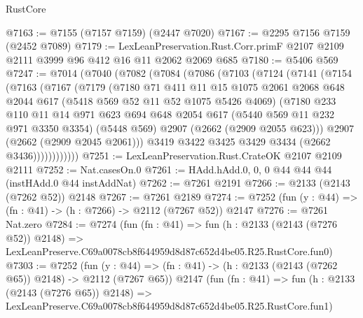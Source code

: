 \begin{lexlean}{RustCore}
\begin{coremodule}
@7163 := @7155 (@7157 @7159) (@2447 @7020)
@7167 := @2295 @7156 @7159 (@2452 @7089)
@7179 := LexLeanPreservation.Rust.Corr.primF
    @2107
    @2109
    @2111
    @3999
    @96
    @412
    @16
    @11
    @2062
    @2069
    @685
@7180 := @5406 @569
@7247 := @7014
    (@7040
      (@7082
        (@7084
          (@7086
            (@7103
              (@7124
                (@7141
                  (@7154
                    (@7163
                      (@7167
                        (@7179
                          (@7180
                            @71
                            @411
                            @11
                            @15
                            @1075
                            @2061
                            @2068
                            @648
                            @2044
                            @617
                            (@5418 @569 @52 @11 @52 @1075 @5426 @4069)
                            (@7180
                              @233
                              @110
                              @11
                              @14
                              @971
                              @623
                              @694
                              @648
                              @2054
                              @617
                              (@5440 @569 @11 @232 @971 @3350 @3354)
                              (@5448 @569)
                              @2907
                              (@2662 (@2909 @2055 @623)))
                            @2907
                            (@2662 (@2909 @2045 @2061)))
                          @3419
                          @3422
                          @3425
                          @3429
                          @3434
                          (@2662 @3436))))))))))))
@7251 := LexLeanPreservation.Rust.CrateOK @2107 @2109 @2111
@7252 := Nat.casesOn.{0}
@7261 := HAdd.hAdd.{0, 0, 0} @44 @44 @44 (instHAdd.{0} @44 instAddNat)
@7262 := @7261 @2191
@7266 := @2133 (@2143 (@7262 @52)) @2148
@7267 := @7261 @2189
@7274 := @7252 (fun (y : @44) => (fn : @41) -> (h : @7266) -> @2112 (@7267 @52)) @2147
@7276 := @7261 Nat.zero
@7284 := @7274
    (fun (fn : @41) =>
    fun (h : @2133 (@2143 (@7276 @52)) @2148) =>
    LexLeanPreserve.C69a0078cb8f644959d8d87c652d4be05.R25.RustCore.fun0)
@7303 := @7252
    (fun (y : @44) => (fn : @41) -> (h : @2133 (@2143 (@7262 @65)) @2148) -> @2112 (@7267 @65))
    @2147
    (fun (fn : @41) =>
    fun (h : @2133 (@2143 (@7276 @65)) @2148) =>
    LexLeanPreserve.C69a0078cb8f644959d8d87c652d4be05.R25.RustCore.fun1)

\end{coremodule}
\end{lexlean}
